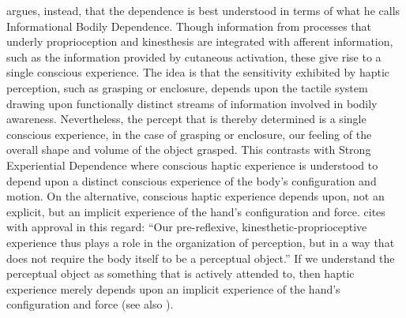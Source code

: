 \citet[chapter 4.8]{Fulkerson:2014ek} argues, instead, that the dependence is best understood in terms of what he calls Informational Bodily Dependence. Though information from processes that underly proprioception and kinesthesis are integrated with afferent information, such as the information provided by cutaneous activation, these give rise to a single conscious experience. The idea is that the sensitivity exhibited by haptic perception, such as grasping or enclosure, depends upon the tactile system drawing upon functionally distinct streams of information involved in bodily awareness. Nevertheless, the percept that is thereby determined is a single conscious experience, in the case of grasping or enclosure, our feeling of the overall shape and volume of the object grasped. This contrasts with Strong Experiential Dependence where conscious haptic experience is understood to depend upon a distinct conscious experience of the body's configuration and motion. On the alternative, conscious haptic experience depends upon, not an explicit, but an implicit experience of the hand's configuration and force. \citet[91]{Fulkerson:2014ek} cites with approval \citet[137]{Gallagher:2005ag} in this regard: ``Our pre-reflexive, kinesthetic-proprioceptive experience thus plays a role in the organization of perception, but in a way that does not require the body itself to be a perceptual object.'' If we understand the perceptual object as something that is actively attended to, then haptic experience merely depends upon an implicit experience of the hand's configuration and force (see also \citealt{Bower:2013aa}).




